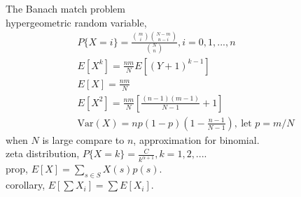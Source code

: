 \documentclass[paper=a4, fontsize=11pt]{scrartcl} %
\numberwithin{equation}{section} %
\numberwithin{figure}{section} %
\numberwithin{table}{section} %
\begin{document}
The Banach match problem\\
hypergeometric random variable,
\begin{align}
	&P\{X=i\} = \frac{{m\choose i}{N-m\choose n-i}}{{N\choose n}}, i=0,1,...,n\\
	&E[X^k] = \frac{nm}{N} E[(Y+1)^{k-1}]\\
	&E[X] = \frac{nm}{N}\\
	&E[X^2] = \frac{nm}{N}\left[\frac{(n-1)(m-1)}{N-1}+1\right]\\
	&\text{Var}(X) = np(1-p)(1 - \frac{n-1}{N-1}),\ \text{let $p=m/N$}
\end{align}
when $N$ is large compare to $n$, approximation for binomial.\\
zeta distribution, $P\{X=k\} = \frac{C}{k^{\alpha +1}}, k=1,2,...$.\\
prop, $E[X]=\sum_{s\in S} X(s)p(s)$.\\
corollary, $E[\sum X_i] = \sum E[X_i]$.\\
\end{document}
